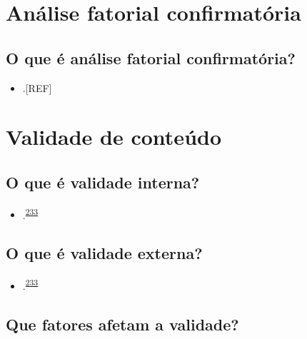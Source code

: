 \documentclass[
  a4paper,
]{book}
\providecommand{\tightlist}{%
  \setlength{\itemsep}{0pt}\setlength{\parskip}{0pt}}
\begin{document}
\hypertarget{analise-fatorial-ocnfirmatoria}{%
\section{Análise fatorial confirmatória}\label{analise-fatorial-ocnfirmatoria}}

\hypertarget{o-que-uxe9-anuxe1lise-fatorial-confirmatuxf3ria}{%
\subsection{O que é análise fatorial confirmatória?}\label{o-que-uxe9-anuxe1lise-fatorial-confirmatuxf3ria}}

\begin{itemize}
\tightlist
\item
  .{[}REF{]}
\end{itemize}

\hypertarget{validade-conteuxfado}{%
\section{Validade de conteúdo}\label{validade-conteuxfado}}

\hypertarget{o-que-uxe9-validade-interna}{%
\subsection{O que é validade interna?}\label{o-que-uxe9-validade-interna}}

\begin{itemize}
\tightlist
\item
  .\textsuperscript{\protect\hyperlink{ref-findley2021}{233}}
\end{itemize}

\hypertarget{o-que-uxe9-validade-externa}{%
\subsection{O que é validade externa?}\label{o-que-uxe9-validade-externa}}

\begin{itemize}
\tightlist
\item
  .\textsuperscript{\protect\hyperlink{ref-findley2021}{233}}
\end{itemize}

\hypertarget{que-fatores-afetam-a-validade}{%
\subsection{Que fatores afetam a validade?}\label{que-fatores-afetam-a-validade}}
\end{document}
